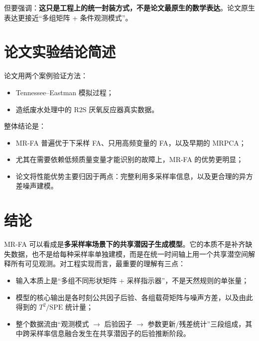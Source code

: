 \documentclass[UTF8]{ctexart}
\begin{document}
但要强调：\textbf{这只是工程上的统一封装方式，不是论文最原生的数学表达}。论文原生表达更接近“多组矩阵 + 条件观测模式”。

\section{论文实验结论简述}

论文用两个案例验证方法：
\begin{itemize}
    \item Tennessee--Eastman 模拟过程；
    \item 造纸废水处理中的 R2S 厌氧反应器真实数据。
\end{itemize}

整体结论是：
\begin{itemize}
    \item MR-FA 普遍优于下采样 FA、只用高频变量的 FA，以及早期的 MRPCA；
    \item 尤其在需要依赖低频质量变量才能识别的故障上，MR-FA 的优势更明显；
    \item 论文将性能优势主要归因于两点：完整利用多采样率信息，以及更合理的异方差噪声建模。
\end{itemize}

\section{结论}

MR-FA 可以看成是\textbf{多采样率场景下的共享潜因子生成模型}。它的本质不是补齐缺失数据，也不是给每种采样率单独建模，而是在统一时间轴上用一个共享潜空间解释所有可见观测。对工程实现而言，最重要的理解有三点：
\begin{itemize}
    \item 输入本质上是“多组不同形状矩阵 + 采样指示器”，不是天然规则的单张量；
    \item 模型的核心输出是各时刻公共因子后验、各组载荷矩阵与噪声方差，以及由此得到的 $T^2/\mathrm{SPE}$ 统计量；
    \item 整个数据流由“观测模式 $\rightarrow$ 后验因子 $\rightarrow$ 参数更新/残差统计”三段组成，其中跨采样率信息融合发生在共享潜因子的后验推断阶段。
\end{itemize}
\end{document}
